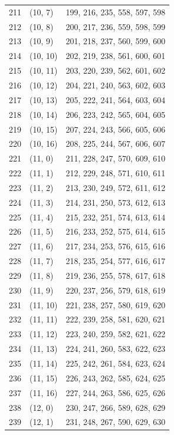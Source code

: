 \documentclass{article}
\begin{document}
\begin{longtable}{lll}
  211 & (10, 7) & 199, 216, 235, 558, 597, 598 \\
  212 & (10, 8) & 200, 217, 236, 559, 598, 599 \\
  213 & (10, 9) & 201, 218, 237, 560, 599, 600 \\
  214 & (10, 10) & 202, 219, 238, 561, 600, 601 \\
  215 & (10, 11) & 203, 220, 239, 562, 601, 602 \\
  216 & (10, 12) & 204, 221, 240, 563, 602, 603 \\
  217 & (10, 13) & 205, 222, 241, 564, 603, 604 \\
  218 & (10, 14) & 206, 223, 242, 565, 604, 605 \\
  219 & (10, 15) & 207, 224, 243, 566, 605, 606 \\
  220 & (10, 16) & 208, 225, 244, 567, 606, 607 \\
  221 & (11, 0) & 211, 228, 247, 570, 609, 610 \\
  222 & (11, 1) & 212, 229, 248, 571, 610, 611 \\
  223 & (11, 2) & 213, 230, 249, 572, 611, 612 \\
  224 & (11, 3) & 214, 231, 250, 573, 612, 613 \\
  225 & (11, 4) & 215, 232, 251, 574, 613, 614 \\
  226 & (11, 5) & 216, 233, 252, 575, 614, 615 \\
  227 & (11, 6) & 217, 234, 253, 576, 615, 616 \\
  228 & (11, 7) & 218, 235, 254, 577, 616, 617 \\
  229 & (11, 8) & 219, 236, 255, 578, 617, 618 \\
  230 & (11, 9) & 220, 237, 256, 579, 618, 619 \\
  231 & (11, 10) & 221, 238, 257, 580, 619, 620 \\
  232 & (11, 11) & 222, 239, 258, 581, 620, 621 \\
  233 & (11, 12) & 223, 240, 259, 582, 621, 622 \\
  234 & (11, 13) & 224, 241, 260, 583, 622, 623 \\
  235 & (11, 14) & 225, 242, 261, 584, 623, 624 \\
  236 & (11, 15) & 226, 243, 262, 585, 624, 625 \\
  237 & (11, 16) & 227, 244, 263, 586, 625, 626 \\
  238 & (12, 0) & 230, 247, 266, 589, 628, 629 \\
  239 & (12, 1) & 231, 248, 267, 590, 629, 630 \\

\end{longtable}
\end{document}
